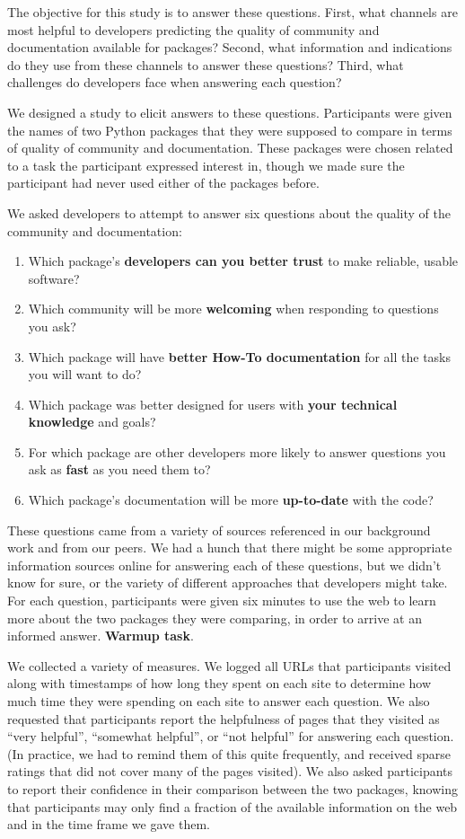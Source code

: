 
The objective for this study is to answer these questions.
First, what channels are most helpful to developers predicting the quality of community and documentation available for packages?
Second, what information and indications do they use from these channels to answer these questions?
Third, what challenges do developers face when answering each question?

We designed a study to elicit answers to these questions.
Participants were given the names of two Python packages that they were supposed to compare in terms of quality of community and documentation.
These packages were chosen related to a task the participant expressed interest in, though we made sure the participant had never used either of the packages before.

We asked developers to attempt to answer six questions about the quality of the community and documentation:
\begin{enumerate}
\setlength{\itemsep}{0pt}
\setlength{\parskip}{0pt}
\setlength{\parsep}{0pt}
\item Which package's \textbf{developers can you better trust} to make reliable, usable software?
\item Which community will be more \textbf{welcoming} when responding to questions you ask?
\item Which package will have \textbf{better How-To documentation} for all the tasks you will want to do?
\item Which package was better designed for users with \textbf{your technical knowledge} and goals?
\item For which package are other developers more likely to answer questions you ask as \textbf{fast} as you need them to?
\item Which package's documentation will be more \textbf{up-to-date} with the code?
\end{enumerate}
These questions came from a variety of sources referenced in our background work and from our peers.
We had a hunch that there might be some appropriate information sources online for answering each of these questions, but we didn't know for sure, or the variety of different approaches that developers might take.
For each question, participants were given six minutes to use the web to learn more about the two packages they were comparing, in order to arrive at an informed answer.
\textbf{Warmup task}.

We collected a variety of measures.
We logged all URLs that participants visited along with timestamps of how long they spent on each site to determine how much time they were spending on each site to answer each question.
We also requested that participants report the helpfulness of pages that they visited as ``very helpful'', ``somewhat helpful'', or ``not helpful'' for answering each question.
(In practice, we had to remind them of this quite frequently, and received sparse ratings that did not cover many of the pages visited).
We also asked participants to report their confidence in their comparison between the two packages, knowing that participants may only find a fraction of the available information on the web and in the time frame we gave them.

